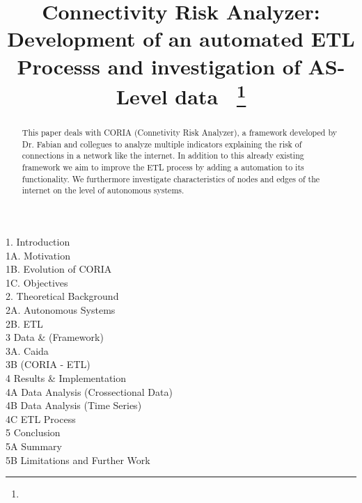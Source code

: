 \documentclass[conference]{IEEEtran}
\begin{document}
\title{Connectivity Risk Analyzer: Development of an automated ETL Processs and investigation of AS-Level data\
{\footnotesize \textsuperscript{}}
\thanks{}
}

\author{
\and
{}

}

\maketitle

1. Introduction \\
1A.  Motivation \\
1B.  Evolution of CORIA \\
1C.  Objectives \\

2. Theoretical Background \\
2A. Autonomous Systems \\
2B. ETL \\

3 Data \& (Framework) \\
3A. Caida \\
3B  (CORIA - ETL) \\

4 Results \& Implementation \\
4A Data Analysis (Crossectional Data) \\
4B Data Analysis (Time Series) \\
4C ETL Process  \\

5 Conclusion \\
5A Summary \\
5B Limitations and Further Work \\

\begin{abstract}

This paper deals with CORIA (Connetivity Risk Analyzer), a framework developed by Dr. Fabian and collegues to analyze multiple indicators explaining the risk of connections in a network like the internet. In addition to this already existing framework we aim to improve the ETL process by adding a automation to its functionality. We furthermore investigate characteristics of nodes and edges of the internet on the level of autonomous systems.
\end{abstract}
\end{document}
